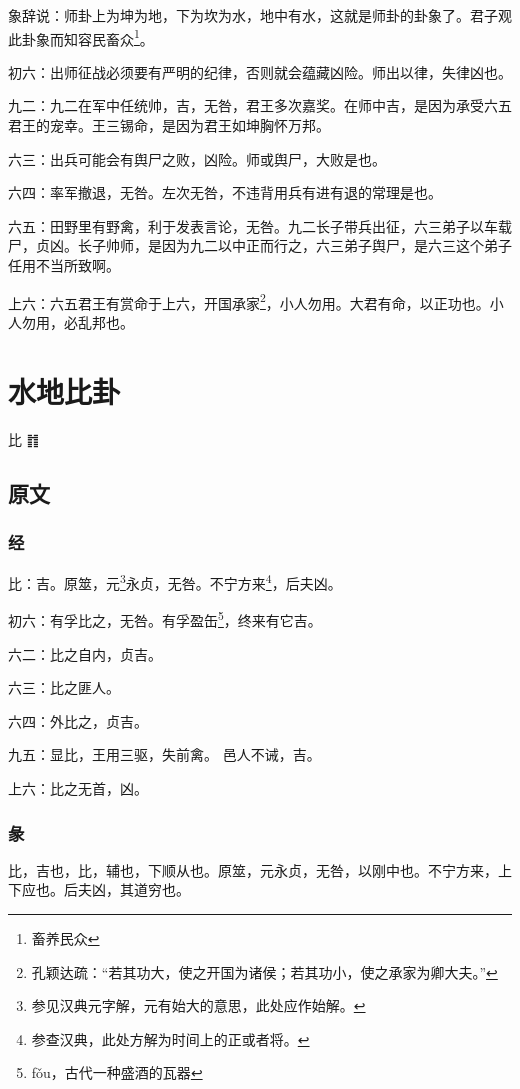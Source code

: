 \documentclass[12pt,oneside]{book}
\begin{document}
象辞说：师卦上为坤为地，下为坎为水，地中有水，这就是师卦的卦象了。君子观此卦象而知容民畜众\footnote{畜养民众}。

初六：出师征战必须要有严明的纪律，否则就会蕴藏凶险。师出以律，失律凶也。

九二：九二在军中任统帅，吉，无咎，君王多次嘉奖。在师中吉，是因为承受六五君王的宠幸。王三锡命，是因为君王如坤胸怀万邦。

六三：出兵可能会有舆尸之败，凶险。师或舆尸，大败是也。

六四：率军撤退，无咎。左次无咎，不违背用兵有进有退的常理是也。

六五：田野里有野禽，利于发表言论，无咎。九二长子带兵出征，六三弟子以车载尸，贞凶。长子帅师，是因为九二以中正而行之，六三弟子舆尸，是六三这个弟子任用不当所致啊。

上六：六五君王有赏命于上六，开国承家\footnote{孔颖达疏：“若其功大，使之开国为诸侯；若其功小，使之承家为卿大夫。”}，小人勿用。大君有命，以正功也。小人勿用，必乱邦也。



\chapter{水地比卦}
比 {\Large ䷇}

\section{原文}
\subsection{经}
比：吉。原筮，元\footnote{参见汉典元字解，元有始大的意思，此处应作始解。}永贞，无咎。不宁方来\footnote{参查汉典，此处方解为时间上的正或者将。}，后夫凶。

初六：有孚比之，无咎。有孚盈缶\footnote{fǒu，古代一种盛酒的瓦器}，终来有它吉。

六二：比之自内，贞吉。

六三：比之匪人。

六四：外比之，贞吉。

九五：显比，王用三驱，失前禽。 邑人不诫，吉。

上六：比之无首，凶。

\subsection{彖}
比，吉也，比，辅也，下顺从也。原筮，元永贞，无咎，以刚中也。不宁方来，上下应也。后夫凶，其道穷也。
\end{document}
